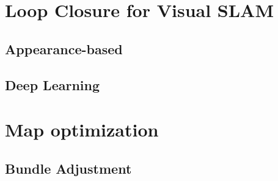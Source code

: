 \section{Loop Closure for Visual SLAM}

\subsection{Appearance-based}

\subsection{Deep Learning}


\section{Map optimization}

\subsection{Bundle Adjustment}



\filbreak